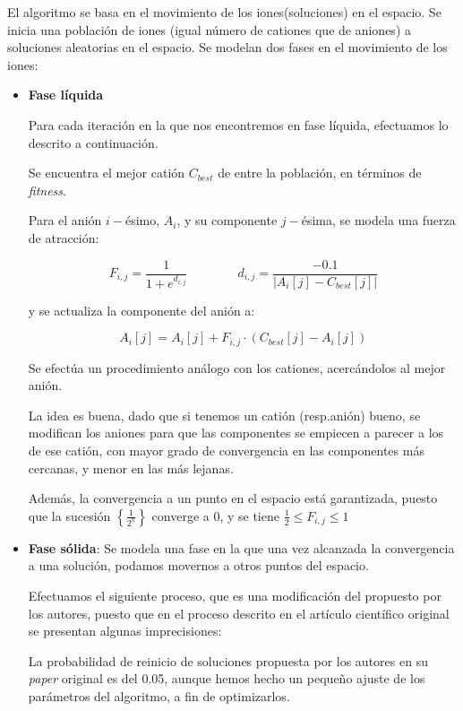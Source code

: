 \documentclass[a4paper,11pt]{article}
\begin{document}
El algoritmo se basa en el movimiento de los iones(soluciones) en el espacio. Se inicia una población de iones (igual número
de cationes que de aniones) a soluciones aleatorias en el espacio.
Se modelan dos fases en el movimiento de los iones:
\begin{itemize}
 \item \textbf{Fase líquida}
 
 Para cada iteración en la que nos encontremos en fase líquida, efectuamos lo descrito a continuación.
 
 Se encuentra el mejor catión $C_{best}$ de entre la población, en términos de \textit{fitness}.
 
 Para el anión $i-$ésimo, $A_i$, y su componente $j-$ésima, se modela una fuerza de atracción:
 
 $$F_{i,j} = \frac{1}{1+e^{d_{i,j}}} \qquad \qquad d_{i,j} = {\frac{-0.1}{|A_{i}[j] - C_{best}[j]|}}$$ 
 
 y se actualiza la componente del anión a:
 
 $$A_i[j] = A_i[j] + F_{i,j} \cdot (C_{best}[j] - A_i[j])$$
 
 Se efectúa un procedimiento análogo con los cationes, acercándolos al mejor anión.
 
 La idea es buena, dado que si tenemos un catión (resp.anión) bueno, se modifican los aniones para que las componentes se
 empiecen a parecer a los de ese catión, con mayor grado de convergencia en las componentes más cercanas, y menor en las más
 lejanas.
 
 Además, la convergencia a un punto en el espacio está garantizada, puesto que la sucesión $\left\{\frac{1}{2^n}\right\}$ converge
 a 0, y se tiene $ \frac{1}{2} \le F_{i,j} \le 1$
 
 
 \item \textbf{Fase sólida}: Se modela una fase en la que una vez alcanzada la convergencia a una solución, podamos movernos
 a otros puntos del espacio.
 
 Efectuamos el siguiente proceso, que es una modificación del propuesto por los autores, puesto que en el proceso descrito
 en el artículo científico original se presentan algunas imprecisiones:
 
  \small{\texttt{}}
  \normalsize

 La probabilidad de reinicio de soluciones propuesta por los autores en su \textit{paper} original es del 0.05, aunque hemos
 hecho un pequeño ajuste de los parámetros del algoritmo, a fin de optimizarlos.
 

\end{itemize}
\end{document}
